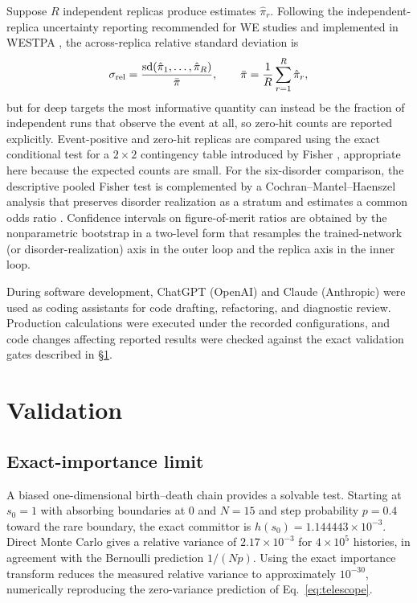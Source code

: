 \documentclass[a4paper,fleqn]{cas-sc}
\begin{document}
Suppose $R$ independent replicas produce estimates $\hat\pi_r$. Following the
independent-replica uncertainty reporting recommended for WE studies \citep{zuckerman2017} and
implemented in WESTPA \citep{russo2022}, the across-replica relative standard deviation is
\begin{equation}
\sigma_{\rm rel}=\frac{\mathrm{sd}(\hat\pi_1,\dots,\hat\pi_R)}{\bar\pi},\qquad
\bar\pi=\frac1R\sum_{r=1}^{R}\hat\pi_r ,
\label{eq:relsd}
\end{equation}
but for deep targets the most informative quantity can instead be the fraction of independent
runs that observe the event at all, so zero-hit counts are reported explicitly. Event-positive
and zero-hit replicas are compared using the exact conditional test for a $2\times2$
contingency table introduced by Fisher \citep{fisher1922}, appropriate here because the
expected counts are small. For the six-disorder comparison, the descriptive pooled Fisher test is
complemented by a Cochran--Mantel--Haenszel analysis that preserves disorder realization as a
stratum and estimates a common odds ratio \citep{mantel1959}. Confidence intervals on
figure-of-merit ratios are obtained by the nonparametric bootstrap \citep{efron1979} in a
two-level form that resamples the trained-network (or disorder-realization) axis in the outer
loop and the replica axis in the inner loop.

During software development, ChatGPT (OpenAI) and Claude (Anthropic) were used as coding
assistants for code drafting, refactoring, and diagnostic review. Production calculations were
executed under the recorded configurations, and code changes affecting reported results were
checked against the exact validation gates described in \S\ref{sec:validation}.

\FloatBarrier

\section{Validation}\label{sec:validation}

\subsection{Exact-importance limit}\label{sec:bd}
A biased one-dimensional birth--death chain provides a solvable test. Starting at $s_0=1$
with absorbing boundaries at $0$ and $N=15$ and step probability $p=0.4$ toward the rare
boundary, the exact committor is $h(s_0)=1.144443\times10^{-3}$. Direct Monte Carlo gives a
relative variance of $2.17\times10^{-3}$ for $4\times10^{5}$ histories, in agreement with the
Bernoulli prediction $1/(Np)$. Using the exact importance transform reduces the measured
relative variance to approximately $10^{-30}$, numerically reproducing the zero-variance
prediction of Eq.~\eqref{eq:telescope}.
\end{document}
